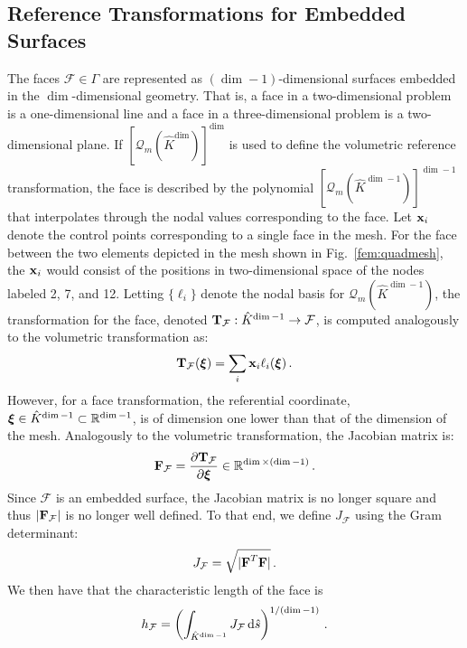 \documentclass[../doc.tex]{subfiles}
\begin{document}
\subsection{Reference Transformations for Embedded Surfaces}
The faces $\mathcal{F} \in \Gamma$ are represented as $(\dim-1)$-dimensional surfaces embedded in the $\dim$-dimensional geometry. That is, a face in a two-dimensional problem is a one-dimensional line and a face in a three-dimensional problem is a two-dimensional plane. If $[\mathcal{Q}_m(\hat{K}^{\dim})]^{\dim}$ is used to define the volumetric reference transformation, the face is described by the polynomial $[\mathcal{Q}_m(\hat{K}^{\dim-1})]^{\dim-1}$ that interpolates through the nodal values corresponding to the face. 
Let $\boldsymbol{\mathrm{x}}_i$ denote the control points corresponding to a single face in the mesh. For the face between the two elements depicted in the mesh shown in Fig.~\ref{fem:quadmesh}, the $\boldsymbol{\mathrm{x}}_i$ would consist of the positions in two-dimensional space of the nodes labeled 2, 7, and 12. Letting $\{\ell_i\}$ denote the nodal basis for $\mathcal{Q}_m(\hat{K}^{\dim-1})$, the transformation for the face, denoted $\boldsymbol{\mathrm{T}}_\mathcal{F} : \hat{K}^{\dim-1} \rightarrow \mathcal{F}$, is computed analogously to the volumetric transformation as: 
	\begin{equation}
		\boldsymbol{\mathrm{T}}_\mathcal{F}(\boldsymbol{\xi}) = \sum_i \boldsymbol{\mathrm{x}}_i \ell_i(\boldsymbol{\xi}) \,. 
	\end{equation}
However, for a face transformation, the referential coordinate, $\boldsymbol{\xi} \in \hat{K}^{\dim-1} \subset \mathbb{R}^{\dim-1}$, is of dimension one lower than that of the dimension of the mesh. Analogously to the volumetric transformation, the Jacobian matrix is: 
	\begin{equation}
		\boldsymbol{\mathrm{F}}_\mathcal{F} = \frac{\partial \boldsymbol{\mathrm{T}}_\mathcal{F}}{\partial \boldsymbol{\xi}} \in \mathbb{R}^{\dim \times (\dim - 1)} \,. 
	\end{equation}
Since $\mathcal{F}$ is an embedded surface, the Jacobian matrix is no longer square and thus $|\boldsymbol{\mathrm{F}}_\mathcal{F}|$ is no longer well defined. To that end, we define $J_\mathcal{F}$ using the Gram determinant: 
	\begin{equation}
		J_\mathcal{F} = \sqrt{|\boldsymbol{\mathrm{F}}^T \boldsymbol{\mathrm{F}}|} \,. 
	\end{equation}
We then have that the characteristic length of the face is 
	\begin{equation}
		h_\mathcal{F} = \left( \int_{\hat{K}^{\dim-1}} J_\mathcal{F}\mathop{}\!\mathrm{d} \hat{s} \right)^{1/(\dim-1)} \,. 
	\end{equation}
\end{document}
